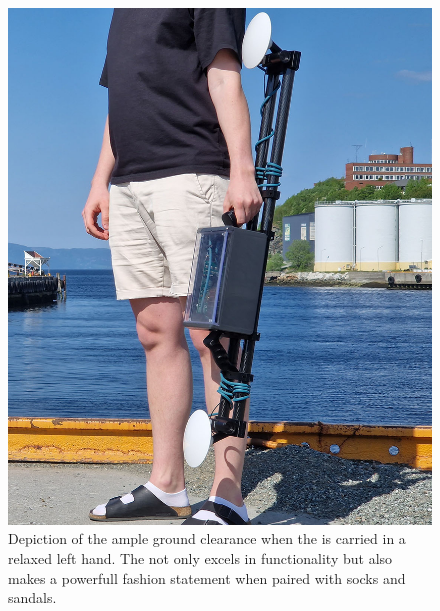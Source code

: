 \begin{figure}[H]
    \centering
    \includegraphics[width=\textwidth]{figures/ergonomics/resting.jpg}
    \caption{Depiction of the ample ground clearance when the \sr is carried in a relaxed left hand. The \sr not only excels in functionality but also makes a powerfull fashion statement when paired with socks and sandals.}
    \label{fig:egonomics_d}
\end{figure}



